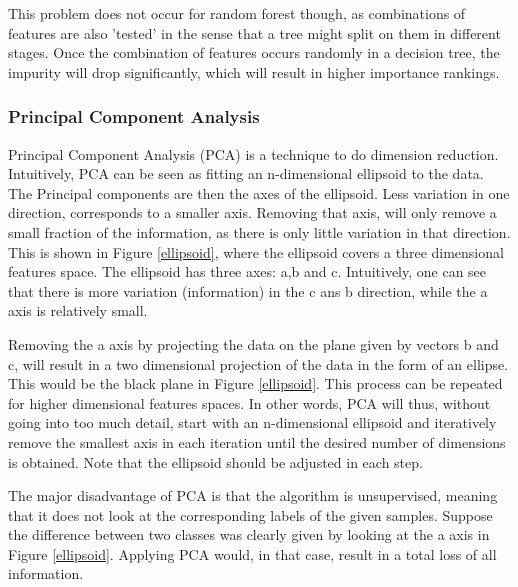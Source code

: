 \npar

This problem does not occur for random forest though, as combinations of features are also 'tested' in the sense that a tree might split on them in different stages. Once the combination of features occurs randomly in a decision tree, the impurity will drop significantly, which will result in higher importance rankings.

\subsubsection{Principal Component Analysis}
\label{pcaExaplained}
Principal Component Analysis (PCA)  is a technique to do dimension reduction. Intuitively, PCA can be seen as fitting an n-dimensional ellipsoid to the data. The Principal components are then the axes of the ellipsoid. Less variation in one direction, corresponds to a smaller axis. Removing that axis, will only remove a small fraction of the information, as there is only little variation in that direction. This is shown in Figure \ref{ellipsoid}, where the ellipsoid covers a three dimensional features space. The ellipsoid has three axes: a,b and c. Intuitively, one can see that there is more variation (information) in the c ans b direction, while the a axis is relatively small.


Removing the a axis by projecting the data on the plane given by vectors b and c, will result in a two dimensional projection of the data in the form of an ellipse. This would be the black plane in Figure \ref{ellipsoid}. This process can be repeated for higher dimensional features spaces. In other words, PCA will thus, without going into too much detail, start with an n-dimensional ellipsoid and iteratively remove the smallest axis in each iteration until the desired number of dimensions is obtained. Note that the ellipsoid should be adjusted in each step.

\npar

The major disadvantage of PCA is that the algorithm is unsupervised, meaning that it does not look at the corresponding labels of the given samples. Suppose the difference between two classes was clearly given by looking at the a axis in Figure \ref{ellipsoid}. Applying PCA would, in that case, result in a total loss of all information.